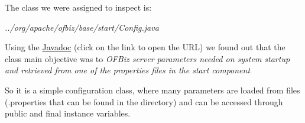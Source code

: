 The class we were assigned to inspect is:

\bigbreak
\textit{../org/apache/ofbiz/base/start/Config.java}
\bigbreak

Using the \href{https://ci.apache.org/projects/ofbiz/site/javadocs/}{Javadoc} (click on the link to open the URL) we found out that the class main objective was to 
\bigbreak
\textit{OFBiz server parameters needed on system startup and retrieved from one of the properties files in the start component}
\bigbreak

So it is a simple configuration class, where many parameters are loaded from files (.properties that can be found in the directory) and can be accessed through public and final instance variables. 